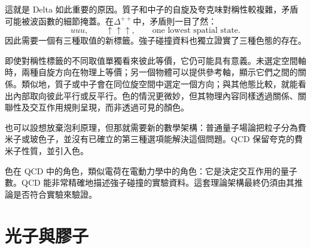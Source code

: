 這就是 Delta 如此重要的原因。質子和中子的自旋及夸克味對稱性較複雜，矛盾可能被波函數的細節掩蓋。在\(\Delta^{++}\)中，矛盾則一目了然：
\begin{equation}
uuu,\qquad
\uparrow\uparrow\uparrow,
\qquad
\text{one lowest spatial state}.
\end{equation}
因此需要一個有三種取值的新標籤。強子碰撞資料也獨立證實了三種色態的存在。

即使對稱性標籤的不同取值單獨看來彼此等價，它仍可能具有意義。未選定空間軸時，兩種自旋方向在物理上等價；另一個物體可以提供參考軸，顯示它們之間的關係。類似地，質子或中子會在同位旋空間中選定一個方向；與其他態比較，就能看出內部取向彼此平行或反平行。色的情況更微妙，但其物理內容同樣透過關係、關聯性及交互作用規則呈現，而非透過可見的顏色。

也可以設想放棄泡利原理，但那就需要新的數學架構：普通量子場論把粒子分為費米子或玻色子，並沒有已確立的第三種選項能解決這個問題。QCD 保留夸克的費米子性質，並引入色。

\begin{classroomqa}
\end{classroomqa}

\begin{classroomqa}
\end{classroomqa}


\begin{classroomqa}
\end{classroomqa}

色在 QCD 中的角色，類似電荷在電動力學中的角色：它是決定交互作用的量子數。QCD 能非常精確地描述強子碰撞的實驗資料。這套理論架構最終仍須由其推論是否符合實驗來驗證。

\section{光子與膠子}

